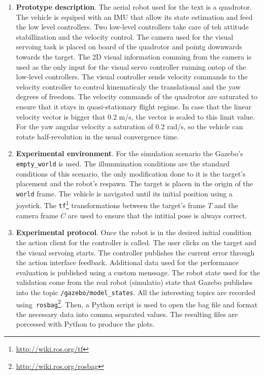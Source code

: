 \begin{enumerate}
	\item \textbf{Prototype description}. The aerial robot used for the text is a quadrotor. The vehicle is equiped with an IMU that allow its state estimation and feed the low level controllers. Two low-level controllers take care of teh attitude stabillization and the velocity control. The camera used for the visual servoing task is placed on board of the quadrotor and pointg downwards towards the target. The 2D visual information comming from the camera is used as the only input for the visual servo controller running ontop of the low-level controllers. The visual controller sends velocity commands to the velocity controller to control kinematicaly the translational and the yaw degrees of freedom. The velocity commands of the quadrotor are saturated to ensure that it stays in quasi-stationary flight regime. In case that the linear velocity vector is bigger that 0.2 m/s, the vector is scaled to this limit value. For the yaw angular velocity a saturation of 0.2 rad/s, so the vehicle can rotate half-revolution in the usual convergence time.
	
	\item \textbf{Experimental environment}. For the simulation scenario the Gazebo's \texttt{empty\_world} is used. The illummination conditions are the standard conditions of this scenario, the only modification done to it is the target's placement and the robot's respawn. The target is placen in the origin of the \texttt{world} frame. The vehicle is navigated until its initial position using a joystick. The \texttt{tf}\footnote{\url{http://wiki.ros.org/tf}} transformations between the target's frame $T$ and the camera frame $C$ are used to ensure that the intitial pose is always correct.
	
	\item \textbf{Experimental protocol}. Once the robot is in the desired initial condition the action client for the controller is called. The user clicks on the target and the visual servoing starts. The controller publishes the current error through the action interface feedback. Additional data used for the performance evaluation is published using a custom menssage. The robot state used for the validation come from the real robot (simulatio) state that Gazebo publishes into the topic \texttt{/gazebo/model\_states}. All the interesting topics are recorded using\texttt{ rosbag}\footnote{\url{http://wiki.ros.org/rosbag}}. Then, a Python script is used to open the bag file and format the necessary data into comma separated values. The resulting files are porcessed with Python to produce the plots.
	

\end{enumerate}
